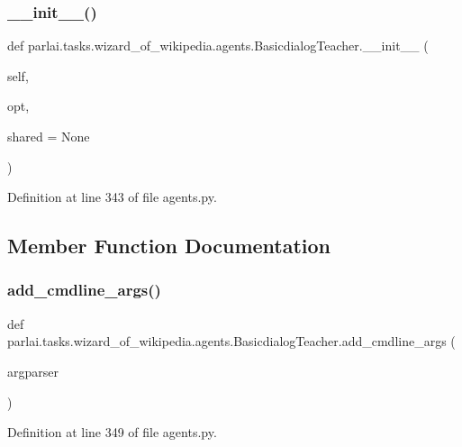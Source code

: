\subsubsection{\texorpdfstring{\+\_\+\+\_\+init\+\_\+\+\_\+()}{\_\_init\_\_()}}
{\footnotesize\ttfamily def parlai.\+tasks.\+wizard\+\_\+of\+\_\+wikipedia.\+agents.\+Basicdialog\+Teacher.\+\_\+\+\_\+init\+\_\+\+\_\+ (\begin{DoxyParamCaption}\item[{}]{self,  }\item[{}]{opt,  }\item[{}]{shared = {\ttfamily None} }\end{DoxyParamCaption})}



Definition at line 343 of file agents.\+py.



\subsection{Member Function Documentation}
\mbox{\label{classparlai_1_1tasks_1_1wizard__of__wikipedia_1_1agents_1_1BasicdialogTeacher_a05990443efe8ab6f6361cbea39d50dca}} 
\subsubsection{\texorpdfstring{add\+\_\+cmdline\+\_\+args()}{add\_cmdline\_args()}}
{\footnotesize\ttfamily def parlai.\+tasks.\+wizard\+\_\+of\+\_\+wikipedia.\+agents.\+Basicdialog\+Teacher.\+add\+\_\+cmdline\+\_\+args (\begin{DoxyParamCaption}\item[{}]{argparser }\end{DoxyParamCaption})\hspace{0.3cm}{\ttfamily [static]}}



Definition at line 349 of file agents.\+py.

